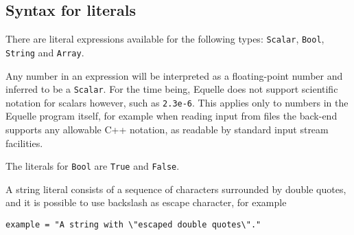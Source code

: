 \documentclass[11pt]{article}
\newcommand{\code}[1]{\texttt{#1}}
\begin{document}
\subsection{Syntax for literals}

There are literal expressions available for the following types: \code{Scalar},
\code{Bool}, \code{String} and \code{Array}.

Any number in an expression will be interpreted as a floating-point number and inferred to
be a \code{Scalar}. For the time being, Equelle does not support scientific notation for
scalars however, such as \code{2.3e-6}. This applies only to numbers in the Equelle
program itself, for example when reading input from files the back-end supports any
allowable C++ notation, as readable by standard input stream facilities.

The literals for \code{Bool} are \code{True} and \code{False}.

A string literal consists of a sequence of characters surrounded by double quotes, and it
is possible to use backslash as escape character, for example
\begin{verbatim}
example = "A string with \"escaped double quotes\"."
\end{verbatim}






\end{document}
